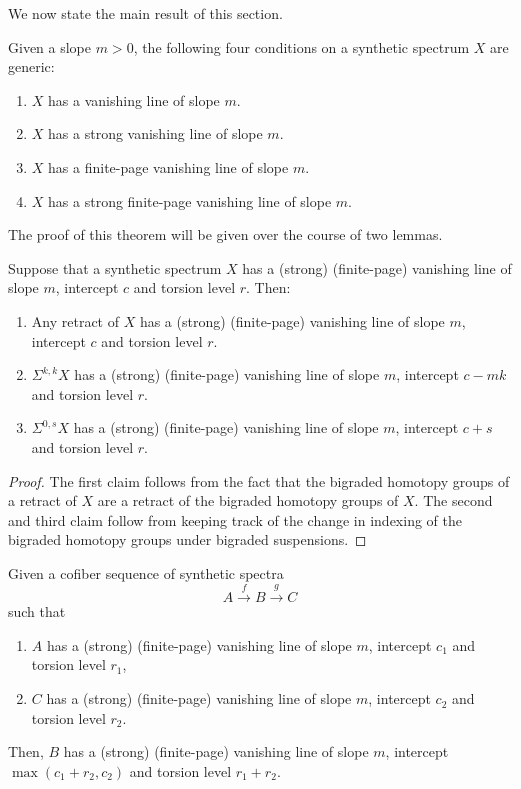 We now state the main result of this section.

\begin{thm}
  \label{thm:vl-are-generic}
  Given a slope $m>0$, the following four conditions on a synthetic spectrum $X$ are generic:
  \begin{enumerate}
  \item $X$ has a vanishing line of slope $m$.
  \item $X$ has a strong vanishing line of slope $m$.
  \item $X$ has a finite-page vanishing line of slope $m$.
  \item $X$ has a strong finite-page vanishing line of slope $m$.
  \end{enumerate}
\end{thm}

The proof of this theorem will be given over the course of two lemmas.

\begin{lem}
  \label{lemm:suspension-line}
  Suppose that a synthetic spectrum $X$ has a (strong) (finite-page) vanishing line of slope $m$, intercept $c$ and torsion level $r$. Then:
  \begin{enumerate}
  \item Any retract of $X$ has a (strong) (finite-page) vanishing line of slope $m$, intercept $c$ and torsion level $r$.
  \item $\Sigma^{k,k} X$ has a (strong) (finite-page) vanishing line of slope $m$, intercept $c-mk$ and torsion level $r$.
  \item $\Sigma^{0,s} X$ has a (strong) (finite-page) vanishing line of slope $m$, intercept $c+s$ and torsion level $r$.
  \end{enumerate}
\end{lem}

\begin{proof}
  The first claim follows from the fact that the bigraded homotopy groups of a retract of $X$ are a retract of the bigraded homotopy groups of $X$.
  The second and third claim follow from keeping track of the change in indexing of the bigraded homotopy groups under bigraded suspensions.
\end{proof}

\begin{lem}
  \label{lemm:cof-line}
  Given a cofiber sequence of synthetic spectra
  $$ A \xrightarrow{f} B \xrightarrow{g} C $$
  such that
  \begin{enumerate}
  \item $A$ has a (strong) (finite-page) vanishing line of slope $m$, intercept $c_1$ and torsion level $r_1$,
  \item $C$ has a (strong) (finite-page) vanishing line of slope $m$, intercept $c_2$ and torsion level $r_2$.
  \end{enumerate}
  Then, $B$ has a (strong) (finite-page) vanishing line of slope $m$, intercept $\max(c_1+r_2,c_2)$ and torsion level $r_1+r_2$.
\end{lem}

